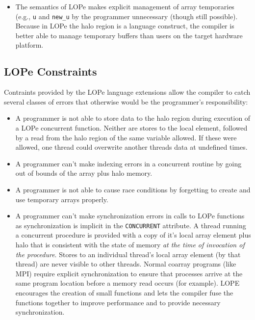 \begin{itemize}
\item
The semantics of LOPe makes explicit management of array temporaries (e.g., \texttt{u} and
\texttt{new\_u} by the programmer unnecessary (though still possible).  Because in LOPe the
halo region is a language construct, the compiler is better able to manage temporary
buffers than users on the target hardware platform.

\end{itemize}

\subsection{LOPe Constraints}

Contraints provided by the LOPe language extensions allow the compiler to catch several classes of
errors that otherwise would be the programmer's responsibility:

\begin{itemize}

\item
A programmer is not able to store data to the halo region during execution of a LOPe concurrent
function.  Neither are stores to the local element, followed by a read from the halo region of the
same variable allowed.  If these were allowed, one thread could overwrite another threads data at
undefined times.

\item
A programmer can't make indexing errors in a concurrent routine by going out of bounds of the array
plus halo memory.

\item
A programmer is not able to cause race conditions by forgetting to create and use temporary arrays
properly.

\item
A programmer can't make synchronization errors in calls to LOPe functions as synchronization is
implicit in the \texttt{CONCURRENT} attribute.  A thread running a concurrent procedure is provided
with a copy of it's local array element plus halo that is consistent with the state of memory
\emph{at the time of invocation of the procedure}.  Stores to an individual thread's local array
element (by that thread) are never visible to other threads.  Normal coarray programs (like MPI)
require explicit synchronization to ensure that processes arrive at the same program location
before a memory read occurs (for example).  LOPE encourages the creation of small functions and
lets the compiler fuse the functions together to improve performance and to provide necessary
synchronization.

\end{itemize}
